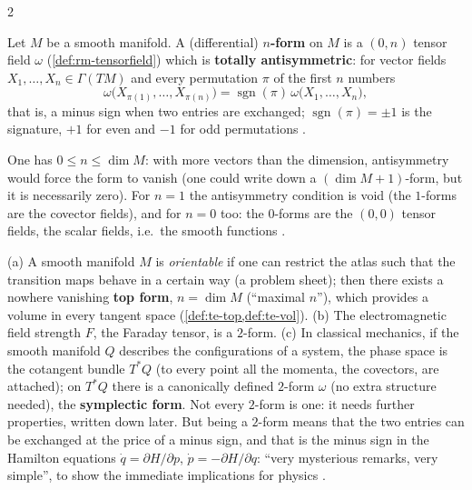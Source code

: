 \begin{paracol}{2}
\begin{definition}\label{def:gr-form}
Let $M$ be a smooth manifold. A (differential) \textbf{$n$-form} on $M$ is a $(0,n)$ tensor field $\omega$ (\cref{def:rm-tensorfield}) which is \textbf{totally antisymmetric}: for vector fields $X_1,\dots,X_n\in\Gamma(TM)$ and every permutation $\pi$ of the first $n$ numbers
\[
  \omega\bigl(X_{\pi(1)},\dots,X_{\pi(n)}\bigr)=\operatorname{sgn}(\pi)\,\omega\bigl(X_1,\dots,X_n\bigr),
\]
that is, a minus sign when two entries are exchanged; $\operatorname{sgn}(\pi)=\pm1$ is the signature, $+1$ for even and $-1$ for odd permutations       .
\end{definition}
One has $0\le n\le\dim M$: with more vectors than the dimension, antisymmetry would force the form to vanish (one could write down a $(\dim M+1)$-form, but it is necessarily zero). For $n=1$ the antisymmetry condition is void (the $1$-forms are the covector fields), and for $n=0$ too: the $0$-forms are the $(0,0)$ tensor fields, the scalar fields, i.e.\ the
smooth functions   .

\begin{example}\label{ex:gr-examples}
(a) A smooth manifold $M$ is \emph{orientable} if one can restrict the atlas such that the transition maps behave in a certain way (a problem sheet); then there exists a nowhere vanishing \textbf{top form}, $n=\dim M$ (``maximal $n$''), which provides a volume in every tangent space (\cref{def:te-top,def:te-vol}).
(b) The electromagnetic field strength $F$, the Faraday tensor, is a $2$-form.
(c) In classical mechanics, if the smooth manifold $Q$ describes the configurations of a system, the phase space is the cotangent bundle $T^*Q$ (to every point all the momenta, the covectors, are attached); on $T^*Q$ there is a canonically defined $2$-form $\omega$ (no extra structure needed), the \textbf{symplectic form}. Not every $2$-form is one: it needs further properties, written down later. But being a $2$-form means that
the two entries can be exchanged at the price of a minus sign, and that is the minus sign in the Hamilton equations $\dot q=\partial H/\partial p$, $\dot p=-\partial H/\partial q$: ``very mysterious remarks, very simple'', to show the immediate implications for physics
        .
\end{example}


\end{paracol}
